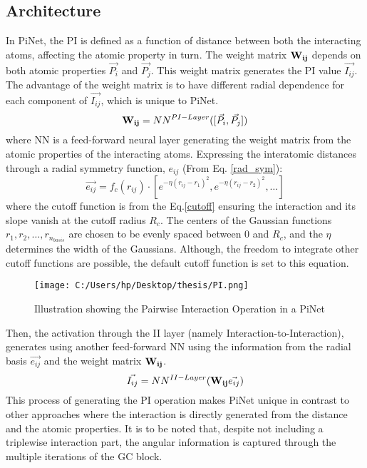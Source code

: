 \documentclass[11pt,a4paper]{report}
\begin{document}
{\subsection{Architecture}
In PiNet, the PI is defined as a function of distance between both the interacting atoms, affecting the atomic property in turn. The weight matrix $\mathbf{W_{ij}}\\$ depends on both atomic properties $\vec{P_i}$ and $\vec{P_j}$. This weight matrix generates the PI value $\vec{I_{ij}}$. The advantage of the weight matrix is to have different radial dependence for each component of 
$\vec{I_{ij}}$, which is unique to PiNet.
\begin{equation}
\mathbf{W_{ij}}\\=NN^{PI-Layer}([\vec{P_i},\vec{P_j}])
\end{equation}
where NN is a feed-forward neural layer generating the weight matrix from the atomic properties of the interacting atoms.
Expressing the interatomic distances through a radial symmetry function, $e_{ij}$ (From Eq. \ref{rad_sym}):
\begin{equation}
\vec{e_{ij}}=f_c(r_{ij}) \cdot [e^{-\eta(r_{ij}-r_1)^2}, e^{-\eta(r_{ij}-r_2)^2},\ldots]
\end{equation}
where the cutoff function is from the Eq.\ref{cutoff} ensuring the interaction and its slope vanish at the cutoff radius $R_c$. The centers of the Gaussian functions $r_1,r_2,\ldots,r_{n_{basis}}$ are chosen to be evenly spaced between 0 and $R_c$, and the $\eta$ determines the width of the Gaussians. Although, the freedom to integrate other cutoff functions are possible, the default cutoff function is set to this equation.

\begin{figure} 
\centering
\texttt{[image: C:/Users/hp/Desktop/thesis/PI.png]}
\caption{Illustration showing the Pairwise Interaction Operation in a PiNet}
\label{PI}
\end{figure}
Then, the activation through the II layer (namely Interaction-to-Interaction), generates using another feed-forward NN using the information from the radial basis $\vec{e_{ij}}$ and the weight matrix $\mathbf{W_{ij}}\\$.
\begin{equation}
\vec{I_{ij}}=NN^{II-Layer}(\mathbf{W_{ij}}\\ \vec{e_{ij}})
\end{equation}
This process of generating the PI operation makes PiNet unique in contrast to other approaches where the interaction is directly generated from the distance and the atomic properties. It is to be noted that, despite not including a triplewise interaction part, the angular information is captured through the multiple iterations of the GC block.

}
\end{document}
